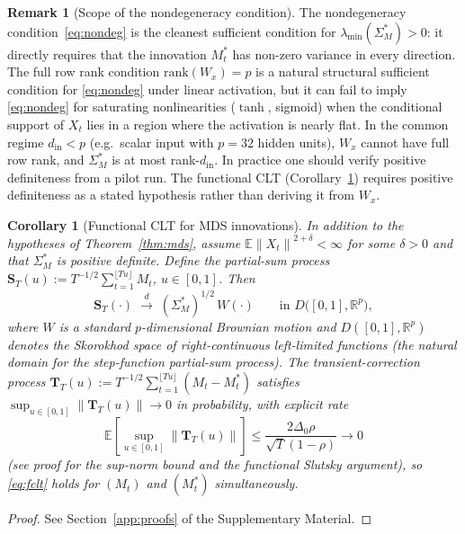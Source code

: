 \documentclass[bj,authoryear]{imsart}
\theoremstyle{plain}
\newtheorem{corollary}[theorem]{Corollary}
\theoremstyle{definition}
\newtheorem{remark}[theorem]{Remark}
\newcommand{\E}{\mathbb{E}}
\newcommand{\R}{\mathbb{R}}
\newcommand{\norm}[1]{\left\lVert #1 \right\rVert}
\begin{document}
\begin{remark}[Scope of the nondegeneracy condition]
\label{rem:rank}
  The nondegeneracy condition~\eqref{eq:nondeg} is the cleanest sufficient
  condition for $\lambda_{\min}(\Sigma_M^*)>0$: it directly requires
  that the innovation $M_t^*$ has non-zero variance in every direction.
  The full row rank condition $\mathrm{rank}(W_x)=p$ is a natural
  structural sufficient condition for \eqref{eq:nondeg} under linear
  activation, but it can fail to imply \eqref{eq:nondeg} for saturating
  nonlinearities ($\tanh$, sigmoid) when the conditional support of $X_t$
  lies in a region where the activation is nearly flat.
  In the common regime $d_{\mathrm{in}} < p$ (e.g.\ scalar input with
  $p=32$ hidden units), $W_x$ cannot have full row rank, and
  $\Sigma_M^*$ is at most rank-$d_{\mathrm{in}}$.
  In practice one should verify positive definiteness from a pilot run.
  The functional CLT (Corollary~\ref{cor:fclt}) requires positive
  definiteness as a stated hypothesis rather than deriving it from $W_x$.
\end{remark}

\begin{corollary}[Functional CLT for MDS innovations]
\label{cor:fclt}
  In addition to the hypotheses of Theorem~\ref{thm:mds}, assume
  $\E\norm{X_t}^{2+\delta}<\infty$ for some $\delta>0$ and that
  $\Sigma_M^*$ is positive definite.  Define the partial-sum process
  $\mathbf{S}_T(u):=T^{-1/2}\sum_{t=1}^{\lfloor Tu\rfloor}M_t$,
  $u\in[0,1]$.  Then
  \begin{equation}
    \mathbf{S}_T(\cdot)
    \;\xrightarrow{d}\;
    (\Sigma_M^*)^{1/2}\,W(\cdot)
    \qquad \text{in } D\bigl([0,1],\R^p\bigr),
    \label{eq:fclt}
  \end{equation}
  where $W$ is a standard $p$-dimensional Brownian motion and
  $D([0,1],\R^p)$ denotes the Skorokhod space of right-continuous
  left-limited functions (the natural domain for the step-function
  partial-sum process).
  The transient-correction process
  $\mathbf{T}_T(u):=T^{-1/2}\sum_{t=1}^{\lfloor Tu\rfloor}(M_t-M_t^*)$
  satisfies $\sup_{u\in[0,1]}\|\mathbf{T}_T(u)\|\to 0$ in probability,
  with explicit rate
  \[
    \E\!\left[\sup_{u\in[0,1]}\|\mathbf{T}_T(u)\|\right]
    \leq \frac{2\Delta_0\rho}{\sqrt{T}(1-\rho)} \to 0
  \]
  (see proof for the sup-norm bound and the functional Slutsky argument),
  so \eqref{eq:fclt} holds for $(M_t)$ and $(M_t^*)$ simultaneously.
\end{corollary}

\begin{proof}
  See Section~\ref{app:proofs} of the Supplementary Material.
\end{proof}
\end{document}
